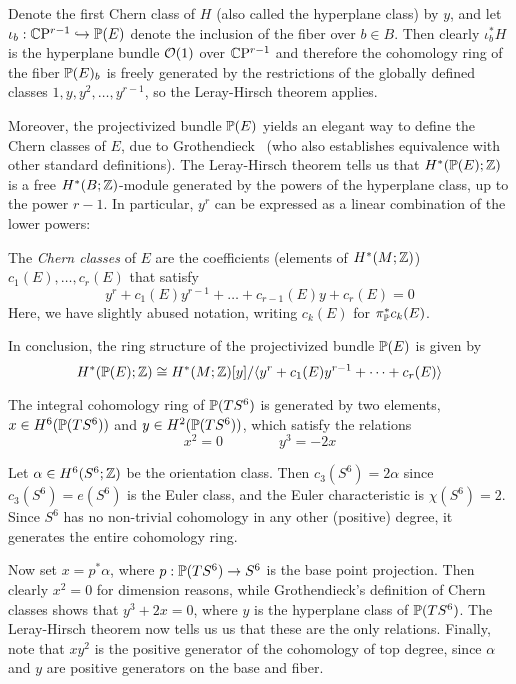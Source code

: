 Denote the first Chern class of $H$ (also called the hyperplane class) by $y$, and let $\iota_b:\CP^{r-1}\hookrightarrow \P(E)$ denote the inclusion of the fiber over $b\in B$. Then clearly $\iota_b^*H$ is the hyperplane bundle $\mc O(1)$ over $\CP^{r-1}$ and therefore the cohomology ring of the fiber $\P(E)_b$ is freely generated by the restrictions of the globally defined classes $1,y,y^2,\dots,y^{r-1}$, so the Leray-Hirsch theorem applies.

Moreover, the projectivized bundle $\P(E)$ yields an elegant way to define the Chern classes of $E$, due to Grothendieck~\cite{Gro1958} (who also establishes equivalence with other standard definitions). The Leray-Hirsch theorem tells us that $H^*(\P(E);\Z)$ is a free $H^*(B;\Z)$-module generated by the powers of the hyperplane class, up to the power $r-1$. In particular, $y^r$ can be expressed as a linear combination of the lower powers:

\begin{mydef}
	The \emph{Chern classes} of $E$ are the coefficients (elements of $H^*(M;\Z)$) $c_1(E),\dots,c_r(E)$ that satisfy
	\begin{equation*}
		y^r+c_1(E)y^{r-1}+\dots+c_{r-1}(E)y+c_r(E)=0
	\end{equation*}
	Here, we have slightly abused notation, writing $c_k(E)$ for $\pi_\P^*c_k(E)$.
\end{mydef}

In conclusion, the ring structure of the projectivized bundle $\P(E)$ is given by
\begin{equation*}
	H^*(\P(E);\Z)\cong H^*(M;\Z)[y]/\langle y^r+c_1(E)y^{r-1}+\dots+c_r(E)\rangle 
\end{equation*}

\begin{prop}\label{prop:cohomofPTS6}
	The integral cohomology ring of $\P(TS^6)$ is generated by two elements, $x\in H^6(\P(TS^6))$ and $y\in H^2(\P(TS^6))$, which satisfy the relations
	\begin{equation*}
		x^2=0\qquad \qquad y^3=-2x
	\end{equation*}
\end{prop}
\begin{myproof}
	Let $\alpha\in H^6(S^6;\Z)$ be the orientation class. Then $c_3(S^6)=2\alpha$ since $c_3(S^6)=e(S^6)$ is the Euler class, and the Euler characteristic is $\chi(S^6)=2$. Since $S^6$ has no non-trivial cohomology in any other (positive) degree, it generates the entire cohomology ring. 
	
	Now set $x=p^*\alpha$, where $p:\P(TS^6)\to S^6$ is the base point projection. Then clearly $x^2=0$ for dimension reasons, while Grothendieck's definition of Chern classes shows that $y^3+2x=0$, where $y$ is the hyperplane class of $\P(TS^6)$. The Leray-Hirsch theorem now tells us us that these are the only relations. Finally, note that $xy^2$ is the positive generator of the cohomology of top degree, since $\alpha$ and $y$ are positive generators on the base and fiber.
\end{myproof}

